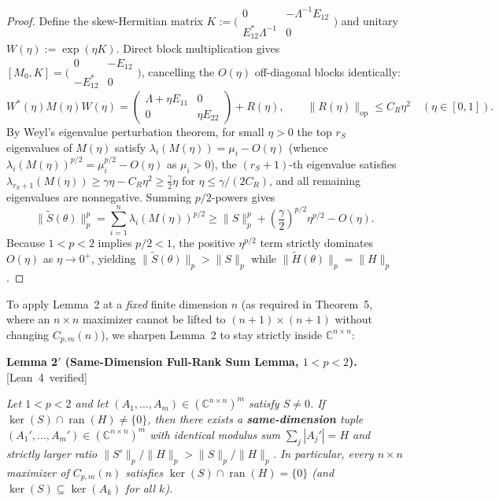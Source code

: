 \documentclass[10pt,letterpaper]{article}
\newcommand{\leanbadge}[1]{\mbox{\sffamily\scriptsize\color{leanborder}[#1]}}
\newcommand{\C}{\mathbb{C}}
\newcommand{\ran}{\operatorname{ran}}
\newcommand{\op}{\mathrm{op}}
\begin{document}
\begin{proof}
Define the skew-Hermitian matrix $K := \bigl(\begin{smallmatrix} 0 & -\Lambda^{-1} E_{12} \\ E_{12}^* \Lambda^{-1} & 0 \end{smallmatrix}\bigr)$ and unitary $W(\eta) := \exp(\eta K)$. Direct block multiplication gives $[M_0, K] = \bigl(\begin{smallmatrix} 0 & -E_{12} \\ -E_{12}^* & 0 \end{smallmatrix}\bigr)$, cancelling the $O(\eta)$ off-diagonal blocks identically:
\[
  W^*(\eta) M(\eta) W(\eta) = \begin{pmatrix} \Lambda + \eta E_{11} & 0 \\ 0 & \eta E_{22} \end{pmatrix} + R(\eta),
  \qquad \|R(\eta)\|_{\op} \le C_R \eta^2 \quad (\eta \in [0,1]).
\]
By Weyl's eigenvalue perturbation theorem, for small $\eta > 0$ the top $r_S$ eigenvalues of $M(\eta)$ satisfy $\lambda_i(M(\eta)) = \mu_i - O(\eta)$ (whence $\lambda_i(M(\eta))^{p/2} = \mu_i^{p/2} - O(\eta)$ as $\mu_i > 0$), the $(r_S + 1)$-th eigenvalue satisfies $\lambda_{r_S + 1}(M(\eta)) \ge \gamma\eta - C_R\eta^2 \ge \frac{\gamma}{2}\eta$ for $\eta \le \gamma/(2C_R)$, and all remaining eigenvalues are nonnegative. Summing $p/2$-powers gives
\[
  \|\widetilde{S}(\theta)\|_p^p = \sum_{i=1}^n \lambda_i(M(\eta))^{p/2} \ge \|S\|_p^p + \left(\frac{\gamma}{2}\right)^{p/2}\eta^{p/2} - O(\eta).
\]
Because $1 < p < 2$ implies $p/2 < 1$, the positive $\eta^{p/2}$ term strictly dominates $O(\eta)$ as $\eta \to 0^+$, yielding $\|\widetilde{S}(\theta)\|_p > \|S\|_p$ while $\|\widetilde{H}(\theta)\|_p = \|H\|_p$.
\end{proof}

To apply Lemma~2 at a \emph{fixed} finite dimension $n$ (as required in Theorem~5, where an $n\times n$ maximizer cannot be lifted to $(n+1)\times(n+1)$ without changing $C_{p,m}(n)$), we sharpen Lemma~2 to stay strictly inside $\C^{n\times n}$:

\begin{tcolorbox}[lemmabox]
\textbf{Lemma 2$'$ (Same-Dimension Full-Rank Sum Lemma, $1 < p < 2$).}\hfill\leanbadge{Lean~4 verified}\par\vspace{1.5pt}
\emph{Let $1 < p < 2$ and let $(A_1,\dots,A_m) \in (\C^{n\times n})^m$ satisfy $S \neq 0$. If $\ker(S) \cap \ran(H) \neq \{0\}$, then there exists a \textbf{same-dimension} tuple $(A_1',\dots,A_m') \in (\C^{n\times n})^m$ with identical modulus sum $\sum_j |A_j'| = H$ and strictly larger ratio $\|S'\|_p / \|H\|_p > \|S\|_p / \|H\|_p$. In particular, every $n\times n$ maximizer of $C_{p,m}(n)$ satisfies $\ker(S) \cap \ran(H) = \{0\}$ (and $\ker(S) \subseteq \ker(A_k)$ for all $k$).}
\end{tcolorbox}
\end{document}
